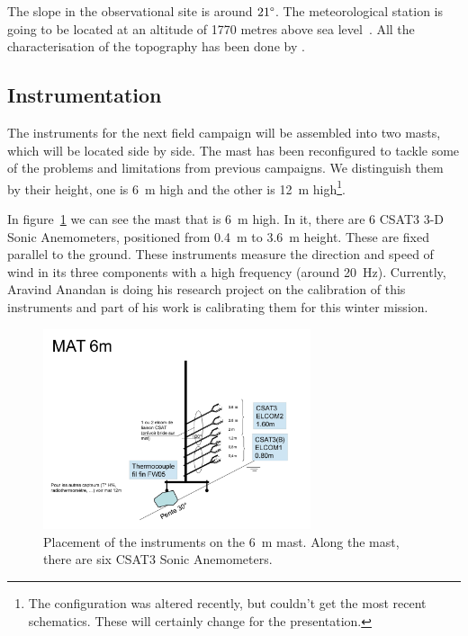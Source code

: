 \documentclass[a4paper,12pt]{article}
\begin{document}
The slope in the observational site is around $21\degree$. The meteorological station is going to be located at an altitude of 1770 metres above sea level~\citep{claudine}. All the characterisation of the topography has been done by \cite{alban}.

\subsection{Instrumentation} \label{instrumentation}
The instruments for the next field campaign will be assembled into two masts, which will be located side by side. The mast has been reconfigured to tackle some of the problems and limitations from previous campaigns. We distinguish them by their height, one is 6~m high and the other is 12~m high\footnote{The configuration was altered recently, but couldn't get the most recent schematics. These will certainly change for the presentation.}. 

In figure~\ref{fig:mast_6} we can see the mast that is 6~m high. In it, there are 6 CSAT3 3-D Sonic Anemometers, positioned from 0.4~m to 3.6~m height. These are fixed parallel to the ground. These instruments measure the direction and speed of wind in its three components with a high frequency (around 20~Hz). Currently, Aravind Anandan is doing his research project on the calibration of this instruments and part of his work is calibrating them for this winter mission.

\begin{figure}[!ht]
  \begin{center}
  \includegraphics[width=0.7\textwidth]{fig/0001.jpg}
  \caption{Placement of the instruments on the 6~m mast. Along the mast, there are six CSAT3 Sonic Anemometers.}
  \label{fig:mast_6}
  \end{center}
\end{figure}
\end{document}
